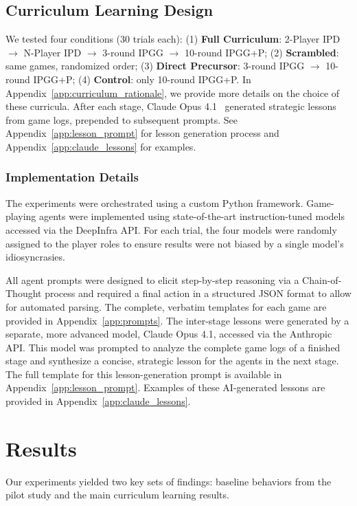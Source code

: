 \documentclass[11pt]{article}
\begin{document}
\subsection{Curriculum Learning Design}
We tested four conditions (30 trials each): (1) \textbf{Full Curriculum}: 2-Player IPD $\rightarrow$ N-Player IPD $\rightarrow$ 3-round IPGG $\rightarrow$ 10-round IPGG+P; (2) \textbf{Scrambled}: same games, randomized order; (3) \textbf{Direct Precursor}: 3-round IPGG $\rightarrow$ 10-round IPGG+P; (4) \textbf{Control}: only 10-round IPGG+P. In Appendix~\ref{app:curriculum_rationale}, we provide more details on the choice of these curricula. After each stage, Claude Opus 4.1~\citep{claude4} generated strategic lessons from game logs, prepended to subsequent prompts. See Appendix~\ref{app:lesson_prompt} for lesson generation process and Appendix~\ref{app:claude_lessons} for examples.


\subsubsection{Implementation Details}
The experiments were orchestrated using a custom Python framework. Game-playing agents were implemented using state-of-the-art instruction-tuned models accessed via the DeepInfra API.  For each trial, the four models were randomly assigned to the player roles to ensure results were not biased by a single model's idiosyncrasies.

All agent prompts were designed to elicit step-by-step reasoning via a Chain-of-Thought process and required a final action in a structured JSON format to allow for automated parsing. The complete, verbatim templates for each game are provided in Appendix~\ref{app:prompts}. The inter-stage lessons were generated by a separate, more advanced model, Claude Opus 4.1, accessed via the Anthropic API. This model was prompted to analyze the complete game logs of a finished stage and synthesize a concise, strategic lesson for the agents in the next stage. The full template for this lesson-generation prompt is available in Appendix~\ref{app:lesson_prompt}. Examples of these AI-generated lessons are provided in Appendix~\ref{app:claude_lessons}.

\section{Results}
Our experiments yielded two key sets of findings: baseline behaviors from the pilot study and the main curriculum learning results.
\end{document}
